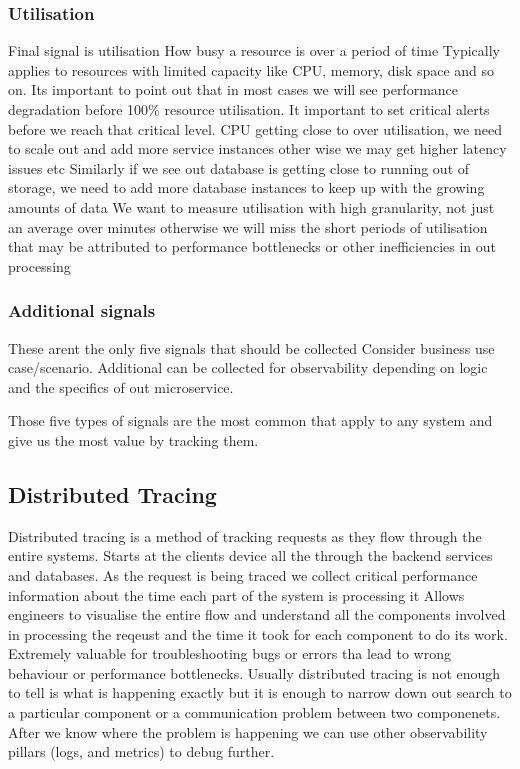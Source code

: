 \subsubsection{Utilisation}
Final signal is utilisation
How busy a resource is over a period of time
Typically applies to resources with limited capacity like CPU, memory, disk space and so on.
Its important to point out that in most cases we will see performance degradation before 100\% resource utilisation.
It important to set critical alerts before we reach that critical level.
CPU getting close to over utilisation, we need to scale out and add more service instances other wise we may get higher latency issues etc
Similarly if we see out database is getting close to running out of storage, we need to add more database instances to keep up with the growing amounts of data
We want to measure utilisation with high granularity, not just an average over minutes otherwise we will miss the short periods of utilisation that may be attributed to performance bottlenecks or other inefficiencies in out processing

\subsubsection{Additional signals}
These arent the only five signals that should be collected
Consider business use case/scenario.
Additional can be collected for observability depending on logic and the specifics of out microservice.

Those five types of signals are the most common that apply to any system and give us the most value by tracking them.

\subsection{Distributed Tracing}
Distributed tracing is a method of tracking requests as they flow through the entire systems.
Starts at the clients device all the through the backend services and databases.
As the request is being traced we collect critical performance information about the time each part of the system is processing it
Allows engineers to visualise the entire flow and understand all the components involved in processing the reqeust and the time it took for each component to do its work.
Extremely valuable for troubleshooting bugs or errors tha lead to wrong behaviour or performance bottlenecks.
Usually distributed tracing is not enough to tell is what is happening exactly but it is enough to narrow down out search to a particular component or a communication problem between two componenets.
After we know where the problem is happening we can use other observability pillars (logs, and metrics) to debug further.

